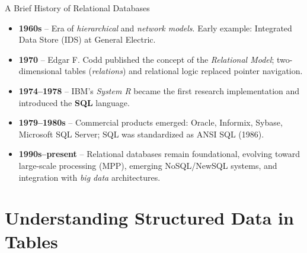 \documentclass[aspectratio=169, table]{beamer}
\begin{document}
\begin{frame}[fragile]{A Brief History of Relational Databases}
\vspace{20pt}

\begin{itemize}
\item \textbf{1960s} – Era of \textit{hierarchical} and \textit{network models}.  
Early example: Integrated Data Store (IDS) at General Electric.

\item \textbf{1970} – Edgar F. Codd published the concept of the \emph{Relational Model};  
two-dimensional tables (\textit{relations}) and relational logic replaced pointer navigation.

\item \textbf{1974–1978} – IBM's \textit{System R} became the first research implementation  
and introduced the \textbf{SQL} language.

\item \textbf{1979–1980s} – Commercial products emerged: Oracle, Informix, Sybase,  
Microsoft SQL Server; SQL was standardized as ANSI SQL (1986).

\item \textbf{1990s–present} – Relational databases remain foundational, evolving toward  
large-scale processing (MPP), emerging NoSQL/NewSQL systems, and integration with  
\textit{big data} architectures.
\end{itemize}

\end{frame}

\section{Understanding Structured Data in Tables}
\end{document}
